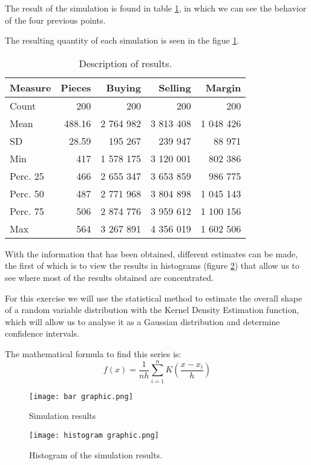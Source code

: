 \documentclass[11pt,a4paper,twocolumn]{article}
\begin{document}
The result of the simulation is found in table \ref{tbl:table 5}, in which we can see the behavior of the four previous points.

The resulting quantity of each simulation is seen in the figue \ref{fig:image 2}.

\begin{table}
\centering
\caption{Description of results.}
\label{tbl:table 5}
\begin{tabular}{lrrrr}
\toprule
Measure&Pieces&Buying&Selling&Margin \\
\midrule
Count&200&200&200&200\\
Mean	&488.16	&2 764 982	&3 813 408	&1 048 426\\
SD		&28.59	&195 267	&239 947	&88 971\\
Min		&417	&1 578 175	&3 120 001	&802 386\\
Perc. 25&466	&2 655 347	&3 653 859	&986 775\\
Perc. 50&487	&2 771 968	&3 804 898	&1 045 143\\
Perc. 75&506	&2 874 776	&3 959 612	&1 100 156\\
Max		&564	&3 267 891	&4 356 019	&1 602 506\\
\bottomrule
\end{tabular}
\end{table}

With the information that has been obtained, different estimates can be made, the first of which is to view the results in histograms (figure \ref{fig:image 3}) that allow us to see where most of the results obtained are concentrated.

For this exercise we will use the statistical method to estimate the overall shape of a random variable distribution with the Kernel Density Estimation function, which will allow us to analyse it as a Gaussian distribution and determine confidence intervals.

The mathematical formula to find this series is:
$$
f(x)=\frac{1}{nh}\sum_{i=1}^{n} K ( \frac{x- x_i}{h})
$$

\begin{figure}[htb]
\centering
\caption{Simulation results}
\texttt{[image: bar graphic.png]}
\label{fig:image 2}
\end{figure} 

\begin{figure}[t]
\centering
\caption{Histogram of the simulation results.}
\texttt{[image: histogram graphic.png]}
\label{fig:image 3}
\end{figure} 
\end{document}
